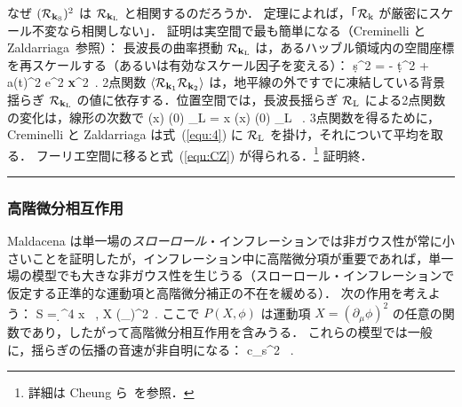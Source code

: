 なぜ $({\cal R}_{{\bf k}_{\rm S} })^2$ は ${\cal R}_{{\bf k}_{\rm L}}$ と相関するのだろうか．
定理によれば，「${\cal R}_{\rm k}$ が厳密にスケール不変なら相関しない」．
証明は実空間で最も簡単になる（Creminelli と Zaldarriaga~\cite{Creminelli:2004yq}参照）：
長波長の曲率摂動 ${\cal R}_{{\bf k}_{\rm L}}$ は，あるハッブル領域内の空間座標を再スケールする（あるいは有効なスケール因子を変える）：
\beq
\d s^2 =  - \d t^2 + a(t)^2 e^{2\R} \d {\bf x}^2\, .
\eeq
2点関数 $\langle {\cal R}_{{\bf k}_1} {\cal R}_{{\bf k}_2} \rangle$ は，地平線の外ですでに凍結している背景揺らぎ ${\cal R}_{{\bf k}_{\rm L}}$ の値に依存する．位置空間では，長波長揺らぎ ${\cal R}_{\rm L}$ による2点関数の変化は，線形の次数で
\beq
\label{equ:4}
 \langle \R(x) \R(0) \rangle \cdot \R_{\rm L} = x  \langle \R(x) \R(0) \rangle \cdot \R_{\rm L} \, .
\eeq 
3点関数を得るために，Creminelli と Zaldarriaga は式~(\ref{equ:4}) に ${\cal R}_{\rm L}$ を掛け，それについて平均を取る．
フーリエ空間に移ると式~(\ref{equ:CZ}) が得られる．\footnote{詳細は Cheung ら~\cite{Cheung:2007sv}を参照．}
証明終．
\vspace{0.2cm}  \hrule
 \vspace{0.5cm}
 


\subsubsection{高階微分相互作用}


Maldacena は単一場の{\it スローロール}・インフレーションでは非ガウス性が常に小さいことを証明したが，インフレーション中に高階微分項が重要であれば，単一場の模型でも大きな非ガウス性を生じうる（スローロール・インフレーションで仮定する正準的な運動項と高階微分補正の不在を緩める）．
次の作用を考えよう：
\beq
S =  \int \d^4 x  \, , \quad {} \quad X \equiv (\partial_\mu \phi)^2\, .
\eeq
ここで $P(X, \phi)$ は運動項 $X=(\partial_\mu \phi)^2$ の任意の関数であり，したがって高階微分相互作用を含みうる．
これらの模型では一般に，揺らぎの伝播の音速が非自明になる：
\beq
c_s^2 \equiv {}\, .
\eeq

